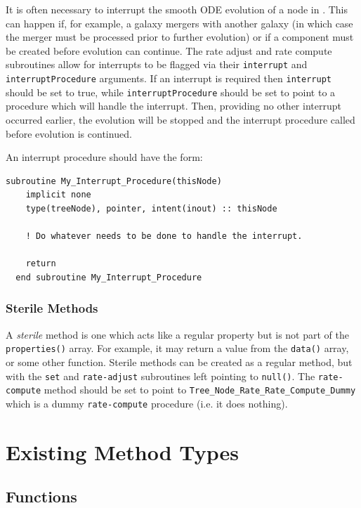 It is often necessary to interrupt the smooth ODE evolution of a node in \glc. This can happen if, for example, a galaxy mergers with another galaxy (in which case the merger must be processed prior to further evolution) or if a component must be created before evolution can continue. The rate adjust and rate compute subroutines allow for interrupts to be flagged via their {\tt interrupt} and {\tt interruptProcedure} arguments. If an interrupt is required then {\tt interrupt} should be set to true, while {\tt interruptProcedure} should be set to point to a procedure which will handle the interrupt. Then, providing no other interrupt occurred earlier, the evolution will be stopped and the interrupt procedure called before evolution is continued.

An interrupt procedure should have the form:
\begin{lstlisting}[escapechar=@,breaklines,prebreak=\&,postbreak=\&]
  subroutine My_Interrupt_Procedure(thisNode)
    implicit none
    type(treeNode), pointer, intent(inout) :: thisNode
  
    ! Do whatever needs to be done to handle the interrupt.

    return
  end subroutine My_Interrupt_Procedure
\end{lstlisting}

\subsubsection{Sterile Methods}

A \emph{sterile} method is one which acts like a regular property but is not part of the {\tt properties()} array. For example, it may return a value from the {\tt data()} array, or some other function. Sterile methods can be created as a regular method, but with the {\tt set} and {\tt rate-adjust} subroutines left pointing to {\tt null()}. The {\tt rate-compute} method should be set to point to {\tt Tree\_Node\_Rate\_Rate\_Compute\_Dummy} which is a dummy {\tt rate-compute} procedure (i.e. it does nothing).

\section{Existing Method Types}

\subsection{Functions}

